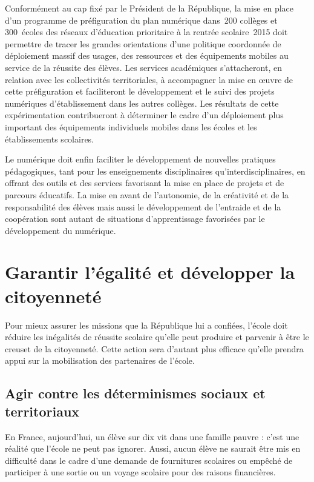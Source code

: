 Conformément au cap fixé par le Président de la République, la mise en place d’un programme de préfiguration du plan numérique dans~200 collèges et 300~écoles des réseaux d’éducation prioritaire à la rentrée scolaire~2015 doit permettre de tracer les grandes orientations d’une politique coordonnée de déploiement massif des usages, des ressources et des équipements mobiles au service de la réussite des élèves. Les services académiques s’attacheront, en relation avec les collectivités territoriales, à accompagner la mise en œuvre de cette préfiguration et faciliteront le développement et le suivi des projets numériques d’établissement dans les autres collèges. Les résultats de cette expérimentation contribueront à déterminer le cadre d’un déploiement plus important des équipements individuels mobiles dans les écoles et les établissements scolaires.

Le numérique doit enfin faciliter le développement de nouvelles pratiques pédagogiques, tant pour les enseignements disciplinaires qu’interdisciplinaires, en offrant des outils et des services favorisant la mise en place de projets et de parcours éducatifs. La mise en avant de l’autonomie, de la créativité et de la responsabilité des élèves mais aussi le développement de l’entraide et de la coopération sont autant de situations d’apprentissage favorisées par le développement du numérique.

\section{Garantir l’égalité et développer la citoyenneté}
Pour mieux assurer les missions que la République lui a confiées, l’école doit réduire les inégalités de réussite scolaire qu’elle peut produire et parvenir à être le creuset de la citoyenneté. Cette action sera d’autant plus efficace qu’elle prendra appui sur la mobilisation des partenaires de l’école.

\subsection{Agir contre les déterminismes sociaux et territoriaux}
En France, aujourd’hui, un élève sur dix vit dans une famille pauvre : c’est une réalité que l’école ne peut pas ignorer. Aussi, aucun élève ne saurait être mis en difficulté dans le cadre d’une demande de fournitures scolaires ou empêché de participer à une sortie ou un voyage scolaire pour des raisons financières.

